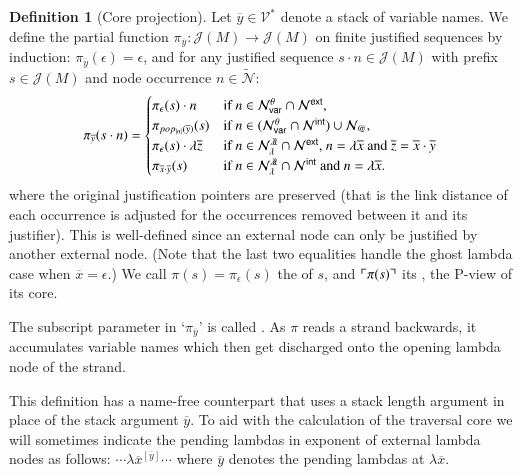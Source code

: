 \documentclass{elsarticle}
\makeatletter
\newif\iflongversion
\theoremstyle{plain}
\theoremstyle{definition}
\newtheorem{definition}{Definition}[section]
\newcommand\VarSet{\mathcal{V}}
\newcommand\Nodes{\mathcal{N}}%
\newcommand\NodesVar{\Nodes_{\sf var}}%
\newcommand\NodesLmd{\Nodes_\lambda}%
\newcommand\NodesApp{\Nodes_@}%
\newcommand{\ghostlmd}{{\lambda\!\!\lambda}}
\newcommand{\ghostvar}{\theta}
\newcommand\ExtendedNodes{\tilde{\Nodes}}
\newcommand\ExtendedNodesVar{\NodesVar^\ghostvar}
\newcommand\ExtendedNodesLmd{\NodesLmd^\ghostlmd}
\def\coresymbol{\pi} %
\newcommand{\core}[1]{\coresymbol(#1)} %
\newcommand{\ExternalNodes}{\Nodes^{\sf ext}}
\newcommand{\InternalNodes}{\Nodes^{\sf int}}
\def\justseqset{\mathcal{J}}
\makeatother
\begin{document}
\begin{definition}[Core projection]
\label{def:coreprojection}
Let $\overline{y} \in \VarSet^*$ denote a stack of variable names.
We define the partial function $\coresymbol_{\overline{y}}\colon \justseqset(M) \longrightarrow \justseqset(M)$ on finite justified sequences by induction: $\coresymbol_{\overline{y}}(\epsilon) = \epsilon$, and for any justified sequence $s \cdot n\in\justseqset(M)$ with prefix $s \in \justseqset(M)$ and node occurrence $n\in\ExtendedNodes$:
\begin{equation*}
\coresymbol_{\overline{y}}(s\cdot n) =
\begin{cases}
    \coresymbol_{\epsilon}(s) \cdot n
    & \mbox{if } n\in\ExtendedNodesVar\inter\ExternalNodes, \\
     \coresymbol_{pop_{|n|}(\overline{y})}(s)
    & \mbox{if } n\in(\ExtendedNodesVar\inter\InternalNodes)\union\NodesApp, \\
    \coresymbol_{\epsilon}(s) \cdot \lambda \overline{z}
    & \mbox{if $n  \in\ExtendedNodesLmd\inter\ExternalNodes$,
     $n = \lambda\overline{x}$ and $\overline{z}=\overline{x}\cdot\overline{y}$} \\
    \coresymbol_{\overline{x} \cdot \overline{y}}(s)
    & \mbox{if $n \in\ExtendedNodesLmd\inter\InternalNodes$
         and $n = \lambda\overline{x}$.}
\end{cases}
\end{equation*}
where the original justification pointers are preserved (that is the link distance of each occurrence is adjusted for the occurrences removed between it and its justifier). This is well-defined since an external node can only be justified by another external node. (Note that the last two equalities handle the ghost lambda case when $\overline{x}=\epsilon$.)
We call $\core{s} = \coresymbol_\epsilon(s)$ the  of $s$,
and $\pview{\core{s}}$ its , the P-view of its core.
\end{definition}

The subscript parameter in `$\coresymbol_{\overline{y}}$' is called . As $\coresymbol$ reads a strand backwards, it accumulates variable names which then get discharged onto the opening lambda node of the strand.
\iflongversion
So in words, the \emph{core projection} is the sub-sequence obtained by removing all internal nodes and discharging on each external lambda node the stack of \emph{pending lambdas} at that point.
\fi
This definition has a name-free counterpart that uses a stack length argument in place of the stack argument $\overline{y}$.
%
To aid with the calculation of the traversal core we will sometimes indicate the pending lambdas in exponent of external lambda nodes as follows:
$\cdots  \lambda\overline{x}^{[\overline{y}]} \cdots$ where $\overline{y}$ denotes the pending lambdas at $\lambda\overline{x}$.
\end{document}
